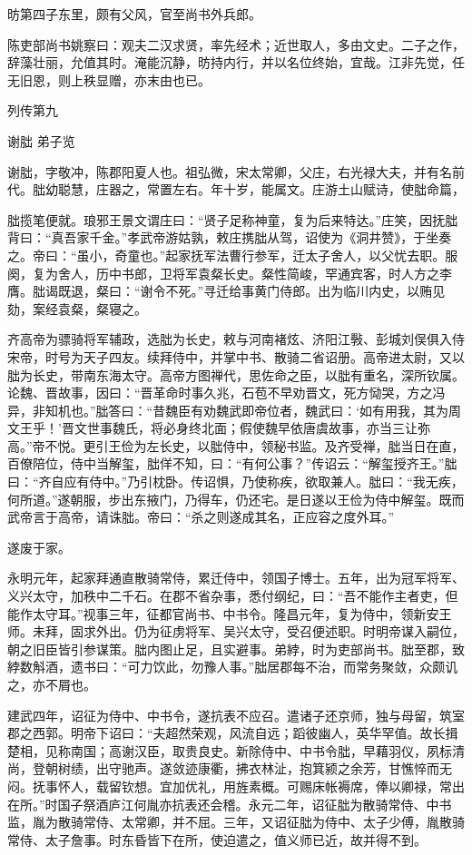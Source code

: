 \documentclass[12pt,UTF8]{ctexbook}
\begin{document}
昉第四子东里，颇有父风，官至尚书外兵郎。

陈吏部尚书姚察曰：观夫二汉求贤，率先经术；近世取人，多由文史。二子之作，辞藻壮丽，允值其时。淹能沉静，昉持内行，并以名位终始，宜哉。江非先觉，任无旧恩，则上秩显赠，亦末由也已。





列传第九

谢朏 弟子览

谢朏，字敬冲，陈郡阳夏人也。祖弘微，宋太常卿，父庄，右光禄大夫，并有名前代。朏幼聪慧，庄器之，常置左右。年十岁，能属文。庄游土山赋诗，使朏命篇，

朏揽笔便就。琅邪王景文谓庄曰：“贤子足称神童，复为后来特达。”庄笑，因抚朏背曰：“真吾家千金。”孝武帝游姑孰，敕庄携朏从驾，诏使为《洞井赞》，于坐奏之。帝曰：“虽小，奇童也。”起家抚军法曹行参军，迁太子舍人，以父忧去职。服阕，复为舍人，历中书郎，卫将军袁粲长史。粲性简峻，罕通宾客，时人方之李膺。朏谒既退，粲曰：“谢令不死。”寻迁给事黄门侍郎。出为临川内史，以贿见劾，案经袁粲，粲寝之。

齐高帝为骠骑将军辅政，选朏为长史，敕与河南褚炫、济阳江斅、彭城刘俣俱入侍宋帝，时号为天子四友。续拜侍中，并掌中书、散骑二省诏册。高帝进太尉，又以朏为长史，带南东海太守。高帝方图禅代，思佐命之臣，以朏有重名，深所钦属。论魏、晋故事，因曰：“晋革命时事久兆，石苞不早劝晋文，死方恸哭，方之冯异，非知机也。”朏答曰：“昔魏臣有劝魏武即帝位者，魏武曰：‘如有用我，其为周文王乎！’晋文世事魏氏，将必身终北面；假使魏早依唐虞故事，亦当三让弥高。”帝不悦。更引王俭为左长史，以朏侍中，领秘书监。及齐受禅，朏当日在直，百僚陪位，侍中当解玺，朏佯不知，曰：“有何公事？”传诏云：“解玺授齐王。”朏曰：“齐自应有侍中。”乃引枕卧。传诏惧，乃使称疾，欲取兼人。朏曰：“我无疾，何所道。”遂朝服，步出东掖门，乃得车，仍还宅。是日遂以王俭为侍中解玺。既而武帝言于高帝，请诛朏。帝曰：“杀之则遂成其名，正应容之度外耳。”

遂废于家。

永明元年，起家拜通直散骑常侍，累迁侍中，领国子博士。五年，出为冠军将军、义兴太守，加秩中二千石。在郡不省杂事，悉付纲纪，曰：“吾不能作主者吏，但能作太守耳。”视事三年，征都官尚书、中书令。隆昌元年，复为侍中，领新安王师。未拜，固求外出。仍为征虏将军、吴兴太守，受召便述职。时明帝谋入嗣位，朝之旧臣皆引参谋策。朏内图止足，且实避事。弟綍，时为吏部尚书。朏至郡，致綍数斛酒，遗书曰：“可力饮此，勿豫人事。”朏居郡每不治，而常务聚敛，众颇讥之，亦不屑也。

建武四年，诏征为侍中、中书令，遂抗表不应召。遣诸子还京师，独与母留，筑室郡之西郭。明帝下诏曰：“夫超然荣观，风流自远；蹈彼幽人，英华罕值。故长揖楚相，见称南国；高谢汉臣，取贵良史。新除侍中、中书令朏，早藉羽仪，夙标清尚，登朝树绩，出守驰声。遂敛迹康衢，拂衣林沚，抱箕颍之余芳，甘憔悴而无闷。抚事怀人，载留钦想。宜加优礼，用旌素概。可赐床帐褥席，俸以卿禄，常出在所。”时国子祭酒庐江何胤亦抗表还会稽。永元二年，诏征朏为散骑常侍、中书监，胤为散骑常侍、太常卿，并不屈。三年，又诏征朏为侍中、太子少傅，胤散骑常侍、太子詹事。时东昏皆下在所，使迫遣之，值义师已近，故并得不到。
\end{document}
